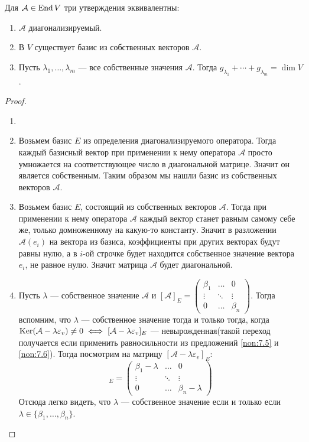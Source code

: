 \documentclass[../main.tex]{subfiles}
\begin{document}
\begin{theorem-non}
  Для $\mathcal{A} \in \operatorname{End} V$ три утверждения эквивалентны:
  \begin{enumerate}
    \item $\mathcal{A}$ диагонализируемый.
    \item В $V$ существует базис из собственных векторов $\mathcal{A}$.
    \item Пусть $\lambda_1, \dotsc, \lambda_m$ --- все собственные значения $\mathcal{A}$. Тогда $g_{\lambda_1} + \dotsb + g_{\lambda_m} = \dim V$.
  \end{enumerate}
\end{theorem-non}
\begin{proof}
  \begin{enumerate}
  \item[]
  \item[] 
  Возьмем базис $E$ из определения диагонализируемого оператора. Тогда каждый базисный вектор при применении к нему оператора $\mathcal{A}$ просто умножается на соответствующее число в диагональной матрице. Значит он является собственным. Таким образом мы нашли базис из собственных векторов $\mathcal{A}$.
  \item[] 
  Возьмем базис $E$, состоящий из собственных векторов $\mathcal{A}$. Тогда при применении к нему оператора $\mathcal{A}$ каждый вектор станет равным самому себе же, только домноженному на какую-то константу. Значит в разложении $\mathcal{A}(e_i)$ на вектора из базиса, коэффициенты при других векторах будут равны нулю, а в $i$-ой строчке будет находится собственное значение вектора $e_i$, не равное нулю. Значит матрица $\mathcal{A}$ будет диагональной.
  \item[] 
  Пусть $\lambda$ --- собственное значение $\mathcal{A}$ и
  $
    [\mathcal{A}]_E =
    \begin{pmatrix}
      \beta_1 & \hdots & 0 \\
      \vdots & \ddots & \vdots \\
      0 & \hdots & \beta_n
    \end{pmatrix}
  $. Тогда вспомним, что $\lambda$ --- собственное значение тогда и только тогда, когда $\operatorname{Ker}(\mathcal{A} - \lambda \varepsilon_v) \neq 0 \iff [\mathcal{A} - \lambda \varepsilon_v]_E$ --- невырожденная(такой переход получается если применить равносильности из предложений \ref{non:7.5} и \ref{non:7.6}). Тогда посмотрим на матрицу $[\mathcal{A} - \lambda \varepsilon_v]_E$:
  \begin{equation*}
    [\mathcal{A} - \lambda \varepsilon_v]_E
    =
    \begin{pmatrix}
      \beta_1 - \lambda & \hdots & 0 \\
      \vdots & \ddots & \vdots \\
      0 & \hdots & \beta_n - \lambda
    \end{pmatrix}
  \end{equation*}
  Отсюда легко видеть, что $\lambda$ --- собственное значение если и только если $\lambda \in \{\beta_1, \dotsc, \beta_n\}$.


\end{enumerate}
\end{proof}
\end{document}
